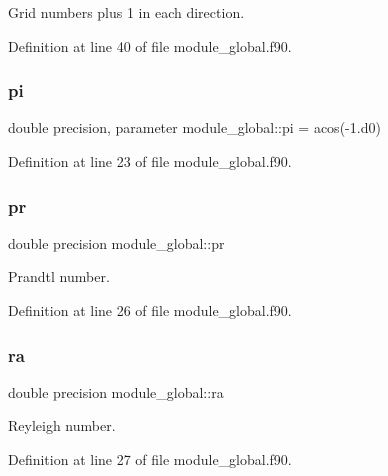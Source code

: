Grid numbers plus 1 in each direction. 



Definition at line 40 of file module\+\_\+global.\+f90.

\mbox{\label{namespacemodule__global_a66e6463e364229164be93ec6fd01a19e}} 
\subsubsection{\texorpdfstring{pi}{pi}}
{\footnotesize\ttfamily double precision, parameter module\+\_\+global\+::pi = acos(-\/1.d0)}



Definition at line 23 of file module\+\_\+global.\+f90.

\mbox{\label{namespacemodule__global_a86b749c501ce7838e1a47aef3b963ddc}} 
\subsubsection{\texorpdfstring{pr}{pr}}
{\footnotesize\ttfamily double precision module\+\_\+global\+::pr}



Prandtl number. 



Definition at line 26 of file module\+\_\+global.\+f90.

\mbox{\label{namespacemodule__global_a7256706b4dc44ce0154f5dec61873a45}} 
\subsubsection{\texorpdfstring{ra}{ra}}
{\footnotesize\ttfamily double precision module\+\_\+global\+::ra}



Reyleigh number. 



Definition at line 27 of file module\+\_\+global.\+f90.

\mbox{\label{namespacemodule__global_abbd64b6182b14d2608b25bb750492f9c}} 
